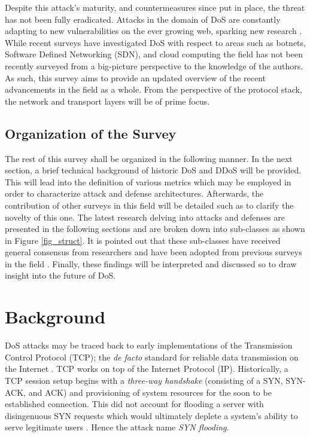 \documentclass[conference]{IEEEtran}
\begin{document}
Despite this attack's maturity, and countermeasures since put in place, the threat has not been fully eradicated. Attacks in the domain of DoS are constantly adapting to new vulnerabilities on the ever growing web, sparking new research \cite{GreenhouseEffect:Marchetta, RealtimeDetection:Miao, SYNFloodDetection:Aborujilah}. While recent surveys have investigated DoS with respect to areas such as botnets, Software Defined Networking (SDN), and cloud computing the field has not been recently surveyed from a big-picture perspective to the knowledge of the authors. As such, this survey aims to provide an updated overview of the recent advancements in the field as a whole. From the perspective of the protocol stack, the network and transport layers will be of prime focus. 

\subsection{Organization of the Survey}
The rest of this survey shall be organized in the following manner. In the next section, a brief technical background of historic DoS and DDoS will be provided. This will lead into the definition of various metrics which may be employed in order to characterize attack and defense architectures. Afterwards, the contribution of other surveys in this field will be detailed such as to clarify the novelty of this one. The latest research delving into attacks and defenses are presented in the following sections and are broken down into sub-classes as shown in Figure \ref{fig_struct}. It is pointed out that these sub-classes have received general consensus from researchers and have been adopted from previous surveys in the field \cite{Botnet:Hoque,Zargar:DDOSFlood}. Finally, these findings will be interpreted and discussed so to draw insight into the future of DoS.

\section{Background}

DoS attacks may be traced back to early implementations of the Transmission Control Protocol (TCP); the \textit{de facto} standard for reliable data transmission on the Internet \cite{DoSTCPAnalysis:Schuba}. TCP works on top of the Internet Protocol (IP). Historically, a TCP session setup begins with a \textit{three-way handshake} (consisting of a SYN, SYN-ACK, and ACK) and provisioning of system resources for the soon to be established connection. This did not account for flooding a server with disingenuous SYN requests which would ultimately deplete a system's ability to serve legitimate users \cite{DoSTCPAnalysis:Schuba}. Hence the attack name \textit{SYN flooding}.
\end{document}
